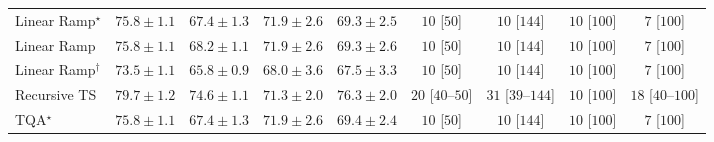 \begin{tabular}{l|cccc|cccc|}
Linear Ramp$^\star$ & {\cellcolor[HTML]{ED7215}} \color[HTML]{F1F1F1} $75.8\pm 1.1$ & {\cellcolor[HTML]{FFF9C5}} \color[HTML]{000000} $67.4\pm 1.3$ & {\cellcolor[HTML]{FEC34F}} \color[HTML]{000000} $71.9\pm 2.6$ & {\cellcolor[HTML]{FEE89D}} \color[HTML]{000000} $69.3\pm 2.5$ & {\cellcolor[HTML]{FFF7F3}} \color[HTML]{000000} $10$ [$50$] & {\cellcolor[HTML]{FFF7F3}} \color[HTML]{000000} $10$ [$144$] & {\cellcolor[HTML]{FFF7F3}} \color[HTML]{000000} $10$ [$100$] & {\cellcolor[HTML]{FFF7F3}} \color[HTML]{000000} $7$ [$100$] \\
Linear Ramp & {\cellcolor[HTML]{ED7215}} \color[HTML]{F1F1F1} $75.8\pm 1.1$ & {\cellcolor[HTML]{FFF4B5}} \color[HTML]{000000} $68.2\pm 1.1$ & {\cellcolor[HTML]{FEC34F}} \color[HTML]{000000} $71.9\pm 2.6$ & {\cellcolor[HTML]{FEE89D}} \color[HTML]{000000} $69.3\pm 2.6$ & {\cellcolor[HTML]{FFF7F3}} \color[HTML]{000000} $10$ [$50$] & {\cellcolor[HTML]{FFF7F3}} \color[HTML]{000000} $10$ [$144$] & {\cellcolor[HTML]{FFF7F3}} \color[HTML]{000000} $10$ [$100$] & {\cellcolor[HTML]{FFF7F3}} \color[HTML]{000000} $7$ [$100$] \\
Linear Ramp$^\dagger$ & {\cellcolor[HTML]{FEA231}} \color[HTML]{000000} $73.5\pm 1.1$ & {\cellcolor[HTML]{FFFFE5}} \color[HTML]{000000} $65.8\pm 0.9$ & {\cellcolor[HTML]{FFF6B9}} \color[HTML]{000000} $68.0\pm 3.6$ & {\cellcolor[HTML]{FFF8C4}} \color[HTML]{000000} $67.5\pm 3.3$ & {\cellcolor[HTML]{FFF7F3}} \color[HTML]{000000} $10$ [$50$] & {\cellcolor[HTML]{FFF7F3}} \color[HTML]{000000} $10$ [$144$] & {\cellcolor[HTML]{FFF7F3}} \color[HTML]{000000} $10$ [$100$] & {\cellcolor[HTML]{FFF7F3}} \color[HTML]{000000} $7$ [$100$] \\
Recursive TS & {\cellcolor[HTML]{A03704}} \color[HTML]{F1F1F1} $79.7\pm 1.2$ & {\cellcolor[HTML]{F88A21}} \color[HTML]{F1F1F1} $74.6\pm 1.1$ & {\cellcolor[HTML]{FECD63}} \color[HTML]{000000} $71.3\pm 2.0$ & {\cellcolor[HTML]{E66A11}} \color[HTML]{F1F1F1} $76.3\pm 2.0$ & {\cellcolor[HTML]{FFF4F0}} \color[HTML]{000000} $20$ [$40$--$50$] & {\cellcolor[HTML]{FFF2EE}} \color[HTML]{000000} $31$ [$39$--$144$] & {\cellcolor[HTML]{FFF7F3}} \color[HTML]{000000} $10$ [$100$] & {\cellcolor[HTML]{FFF5F1}} \color[HTML]{000000} $18$ [$40$--$100$] \\
TQA$^\star$ & {\cellcolor[HTML]{ED7215}} \color[HTML]{F1F1F1} $75.8\pm 1.1$ & {\cellcolor[HTML]{FFF9C5}} \color[HTML]{000000} $67.4\pm 1.3$ & {\cellcolor[HTML]{FEC34F}} \color[HTML]{000000} $71.9\pm 2.6$ & {\cellcolor[HTML]{FEE89B}} \color[HTML]{000000} $69.4\pm 2.4$ & {\cellcolor[HTML]{FFF7F3}} \color[HTML]{000000} $10$ [$50$] & {\cellcolor[HTML]{FFF7F3}} \color[HTML]{000000} $10$ [$144$] & {\cellcolor[HTML]{FFF7F3}} \color[HTML]{000000} $10$ [$100$] & {\cellcolor[HTML]{FFF7F3}} \color[HTML]{000000} $7$ [$100$] \\

\end{tabular}
